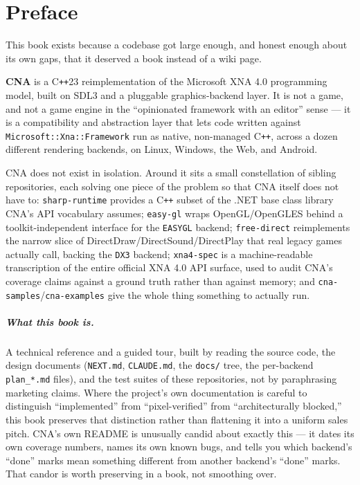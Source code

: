 \chapter*{Preface}

This book exists because a codebase got large enough, and honest enough about its own
gaps, that it deserved a book instead of a wiki page.

\textbf{CNA} is a C\texttt{++}23 reimplementation of the Microsoft XNA 4.0 programming
model, built on SDL3 and a pluggable graphics-backend layer. It is not a game, and not a
game engine in the ``opinionated framework with an editor'' sense --- it is a compatibility
and abstraction layer that lets code written against \texttt{Microsoft::Xna::Framework}
run as native, non-managed C\texttt{++}, across a dozen different rendering backends, on
Linux, Windows, the Web, and Android.

CNA does not exist in isolation. Around it sits a small constellation of sibling
repositories, each solving one piece of the problem so that CNA itself does not have to:
\texttt{sharp-runtime} provides a C\texttt{++} subset of the .NET base class library CNA's
API vocabulary assumes; \texttt{easy-gl} wraps OpenGL/OpenGLES behind a toolkit-independent
interface for the \texttt{EASYGL} backend; \texttt{free-direct} reimplements the narrow
slice of DirectDraw/DirectSound/DirectPlay that real legacy games actually call, backing
the \texttt{DX3} backend; \texttt{xna4-spec} is a machine-readable transcription of the
entire official XNA 4.0 API surface, used to audit CNA's coverage claims against a ground
truth rather than against memory; and \texttt{cna-samples}/\texttt{cna-examples} give the
whole thing something to actually run.

\paragraph{What this book is.} A technical reference and a guided tour, built by reading
the source code, the design documents (\texttt{NEXT.md}, \texttt{CLAUDE.md}, the \texttt{docs/}
tree, the per-backend \texttt{plan\_*.md} files), and the test suites of these repositories,
not by paraphrasing marketing claims. Where the project's own documentation is careful to
distinguish ``implemented'' from ``pixel-verified'' from ``architecturally blocked,'' this
book preserves that distinction rather than flattening it into a uniform sales pitch. CNA's
own README is unusually candid about exactly this --- it dates its own coverage numbers,
names its own known bugs, and tells you which backend's ``done'' marks mean something different
from another backend's ``done'' marks. That candor is worth preserving in a book, not smoothing over.

